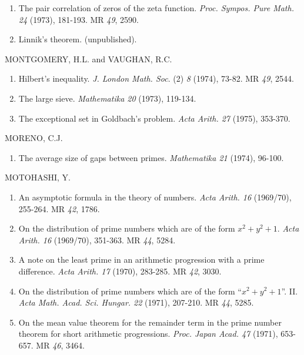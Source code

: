 \begin{thebibliography}{99}
\begin{enumerate}
\item The pair correlation of zeros of the zeta
  function. \textit{Proc. Sympos. Pure Math.} {\em 24} (1973), 181-193. MR
  {\em 49}, 2590. 

\item Linnik's theorem. (unpublished).
\end{enumerate}

 MONTGOMERY, H.L. and VAUGHAN, R.C.
\begin{enumerate}
\item Hilbert's inequality. \textit{J. London Math. Soc}. (2)
  {\em 8} (1974), 73-82. MR {\em 49}, 2544.
 
\item The large sieve. \textit{Mathematika 20} (1973), 119-134. 

\item The exceptional set in Goldbach's problem. \textit{Acta
  Arith. 27} (1975), 353-370. 
\end{enumerate}

 MORENO, C.J.
\begin{enumerate}
\item The average size of gaps between primes. \textit{Mathematika
  21} (1974), 96-100. 
\end{enumerate}

 MOTOHASHI, Y.\pageoriginale
\begin{enumerate}
\item An asymptotic formula in the theory of numbers. \textit{Acta
  Arith. 16} (1969/70), 255-264. MR {\em 42}, 1786. 

\item On the distribution of prime numbers which are of the form
  $x^2+y^2+1$. \textit{Acta Arith. 16} (1969/70), 351-363. MR
  {\em 44}, 5284. 

\item A note on the least prime in an arithmetic progression with a
  prime difference. \textit{Acta Arith. 17} (1970), 283-285. MR
  {\em 42}, 3030. 

\item On the distribution of prime numbers which are of the form
  ``$x^2+y^2+1$''. II. \textit{Acta
  Math. Acad. Sci. Hungar. 22} (1971), 207-210. MR {\em 44}, 5285. 

\item On the mean value theorem for the remainder term in the prime
  number theorem for short arithmetic progressions. \textit{Proc. Japan
    Acad. 47} (1971), 653-657. MR {\em 46}, 3464. 


\end{enumerate}
\end{thebibliography}
